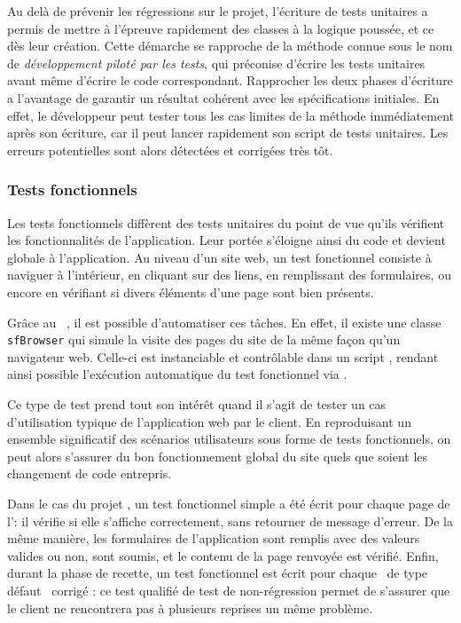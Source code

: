 Au delà de prévenir les régressions sur le projet, l'écriture de tests unitaires a permis de mettre à l'épreuve rapidement des classes à la logique poussée, et ce dès leur création. Cette démarche se rapproche de la méthode connue sous le nom de \emph{développement piloté par les tests}, qui préconise d'écrire les tests unitaires avant même d'écrire le code correspondant. Rapprocher les deux phases d'écriture a l'avantage de garantir un résultat cohérent avec les spécifications initiales. En effet, le développeur peut tester tous les cas limites de la méthode immédiatement après son écriture, car il peut lancer rapidement son script de tests unitaires. Les erreurs potentielles sont alors détectées et corrigées très tôt.


\subsubsection{Tests fonctionnels}

Les tests fonctionnels diffèrent des tests unitaires du point de vue qu'ils vérifient les fonctionnalités de l'application. Leur portée s'éloigne ainsi du code et devient globale à l'application. Au niveau d'un site web, un test fonctionnel consiste à naviguer à l'intérieur, en cliquant sur des liens, en remplissant des formulaires, ou encore en vérifiant si divers éléments d'une page sont bien présents.

Grâce au \afm\ \asf, il est possible d'automatiser ces tâches. En effet, il existe une classe \texttt{sfBrowser} qui simule la visite des pages du site de la même façon qu'un navigateur web. Celle-ci est instanciable et contrôlable dans un script \aphp, rendant ainsi possible l'exécution automatique du test fonctionnel via \asismo.

Ce type de test prend tout son intérêt quand il s'agit de tester un cas d'utilisation typique de l'application web par le client. En reproduisant un ensemble significatif des scénarios utilisateurs sous forme de tests fonctionnels, on peut alors s'assurer du bon fonctionnement global du site quels que soient les changement de code entrepris.

Dans le cas du projet \aey, un test fonctionnel simple a été écrit pour chaque page de l'\aintranet : il vérifie si elle s'affiche correctement, sans retourner de message d'erreur. De la même manière, les formulaires de l'application sont remplis avec des valeurs valides ou non, sont soumis, et le contenu de la page renvoyée est vérifié. Enfin, durant la phase de recette, un test fonctionnel est écrit pour chaque \abug\ de type \og défaut \fg\ corrigé : ce test qualifié de test de non-régression permet de s'assurer que le client ne rencontrera pas à plusieurs reprises un même problème. 
